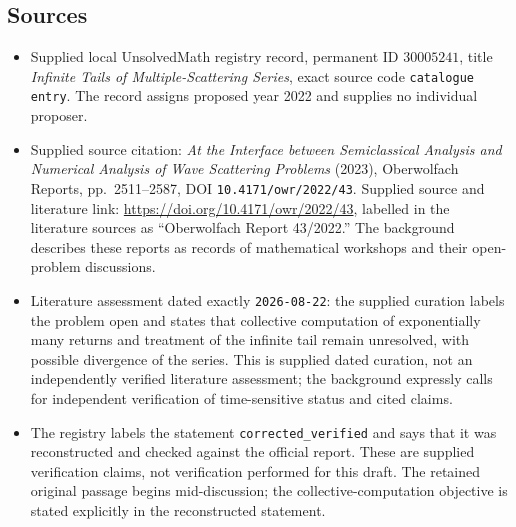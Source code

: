\documentclass[11pt]{article}
\begin{document}
\subsection{Sources}
\begin{itemize}
\item Supplied local UnsolvedMath registry record, permanent ID \(30005241\), title \emph{Infinite Tails of Multiple-Scattering Series}, exact source code \texttt{catalogue entry}. The record assigns proposed year 2022 and supplies no individual proposer.
\item Supplied source citation: \emph{At the Interface between Semiclassical Analysis and Numerical Analysis of Wave Scattering Problems} (2023), Oberwolfach Reports, pp.~2511--2587, DOI \texttt{10.4171/owr/2022/43}. Supplied source and literature link: \url{https://doi.org/10.4171/owr/2022/43}, labelled in the literature sources as ``Oberwolfach Report 43/2022.'' The background describes these reports as records of mathematical workshops and their open-problem discussions.
\item Literature assessment dated exactly \texttt{2026-08-22}: the supplied curation labels the problem open and states that collective computation of exponentially many returns and treatment of the infinite tail remain unresolved, with possible divergence of the series. This is supplied dated curation, not an independently verified literature assessment; the background expressly calls for independent verification of time-sensitive status and cited claims.
\item The registry labels the statement \texttt{corrected\_verified} and says that it was reconstructed and checked against the official report. These are supplied verification claims, not verification performed for this draft. The retained original passage begins mid-discussion; the collective-computation objective is stated explicitly in the reconstructed statement.
\end{itemize}
\end{document}

